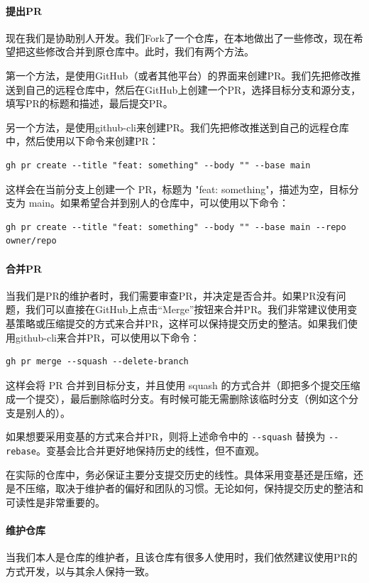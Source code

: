 \paragraph{提出PR} 现在我们是协助别人开发。我们Fork了一个仓库，在本地做出了一些修改，现在希望把这些修改合并到原仓库中。此时，我们有两个方法。

第一个方法，是使用GitHub（或者其他平台）的界面来创建PR。我们先把修改推送到自己的远程仓库中，然后在GitHub上创建一个PR，选择目标分支和源分支，填写PR的标题和描述，最后提交PR。

另一个方法，是使用github-cli来创建PR。我们先把修改推送到自己的远程仓库中，然后使用以下命令来创建PR：
\begin{verbatim}
gh pr create --title "feat: something" --body "" --base main
\end{verbatim}
这样会在当前分支上创建一个 PR，标题为 "feat: something"，描述为空，目标分支为 main。如果希望合并到别人的仓库中，可以使用以下命令：
\begin{verbatim}
gh pr create --title "feat: something" --body "" --base main --repo owner/repo
\end{verbatim}

\paragraph{合并PR} 当我们是PR的维护者时，我们需要审查PR，并决定是否合并。如果PR没有问题，我们可以直接在GitHub上点击“Merge”按钮来合并PR。我们非常建议使用变基策略或压缩提交的方式来合并PR，这样可以保持提交历史的整洁。如果我们使用github-cli来合并PR，可以使用以下命令：
\begin{verbatim}
gh pr merge --squash --delete-branch
\end{verbatim}
这样会将 PR 合并到目标分支，并且使用 squash 的方式合并（即把多个提交压缩成一个提交），最后删除临时分支。有时候可能无需删除该临时分支（例如这个分支是别人的）。

如果想要采用变基的方式来合并PR，则将上述命令中的 \verb|--squash| 替换为 \verb|--rebase|。变基会比合并更好地保持历史的线性，但不直观。

在实际的仓库中，务必保证主要分支提交历史的线性。具体采用变基还是压缩，还是不压缩，取决于维护者的偏好和团队的习惯。无论如何，保持提交历史的整洁和可读性是非常重要的。

\paragraph{维护仓库} 当我们本人是仓库的维护者，且该仓库有很多人使用时，我们依然建议使用PR的方式开发，以与其余人保持一致。

